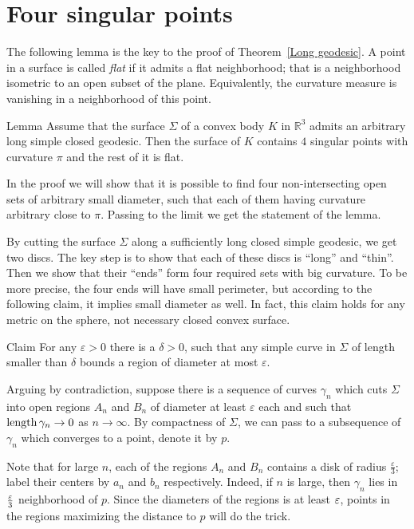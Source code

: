 \documentclass[oneside,a4paper, 12pt]{article}
\begin{document}
\section{Four singular points}

The following lemma is the key to the proof of Theorem~\ref{Long geodesic}.
A point in a surface is called \emph{flat} if it admits a flat neighborhood;
that is a neighborhood isometric to an open subset of the plane.
Equivalently, the curvature measure is vanishing in a neighborhood of this point.

\begin{thm}{Lemma} 
	\label{lem:4 singular points}
Assume that the surface $\Sigma$ of a convex body $K$ in $\mathbb{R}^3$
admits an arbitrary long simple closed geodesic.
Then the surface of $K$ contains $4$ singular points with curvature $\pi$ and the rest of it is flat.
\end{thm}

In the proof we will show that 
it is possible to find four non-intersecting open sets of arbitrary small diameter, 
such that each of them having curvature arbitrary close to $\pi$.
Passing to the limit we get the statement of the lemma.

By cutting the surface $\Sigma$ along a sufficiently long closed simple geodesic,
we get two discs.
The key step is to show that each of these discs is ``long'' and ``thin''.
Then we show that their ``ends'' form four required sets with big curvature.
To be more precise, the four ends will have small perimeter,
but according to the following claim, it implies small diameter as well.
In fact, this claim holds for any metric on the sphere, not necessary closed convex surface.

\begin{thm}{Claim}\label{Lemma:diameter-perimeter}
For any $\varepsilon>0$ there is a $\delta>0$, such that any simple curve in $\Sigma$ of length smaller than $\delta$ bounds a region of diameter at most $\varepsilon$.
\end{thm}

Arguing by contradiction, suppose there is a sequence of curves $\gamma_n$ which cuts $\Sigma$ into open regions $A_n$ and $B_n$ of diameter at least $\varepsilon$ each and such that $\mathop{\rm length}\nolimits\gamma_n\to 0$ as $n\to\infty$. 
By compactness of $\Sigma$,
we can pass to a subsequence of $\gamma_n$ which converges to a point, denote it by $p$. 

Note that for large $n$, each of the regions $A_n$ and $B_n$ contains a disk of radius $\tfrac\varepsilon3$;
label their centers by $a_n$ and $b_n$ respectively. 
Indeed, if $n$ is large, then $\gamma_n$ lies in $\tfrac{\varepsilon}3$ neighborhood of $p$.
Since the diameters of the regions is at least $\varepsilon$, points in the regions maximizing the distance to $p$ will do the trick.
\end{document}
